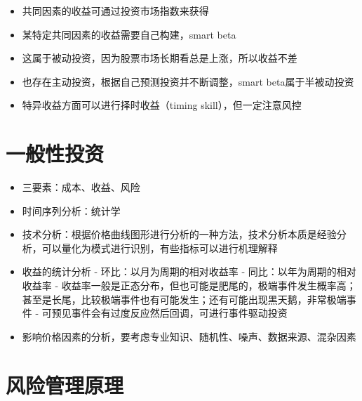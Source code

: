 \documentclass[]{book}
\providecommand{\tightlist}{%
  \setlength{\itemsep}{0pt}\setlength{\parskip}{0pt}}
\begin{document}
\begin{itemize}
\tightlist
\item
  共同因素的收益可通过投资市场指数来获得
\item
  某特定共同因素的收益需要自己构建，smart beta
\item
  这属于被动投资，因为股票市场长期看总是上涨，所以收益不差
\item
  也存在主动投资，根据自己预测投资并不断调整，smart beta属于半被动投资
\item
  特异收益方面可以进行择时收益（timing skill），但一定注意风控
\end{itemize}

\section{一般性投资}

\begin{itemize}
\tightlist
\item
  三要素：成本、收益、风险
\item
  时间序列分析：统计学
\item
  技术分析：根据价格曲线图形进行分析的一种方法，技术分析本质是经验分析，可以量化为模式进行识别，有些指标可以进行机理解释
\item
  收益的统计分析
  - 环比：以月为周期的相对收益率
  - 同比：以年为周期的相对收益率
  - 收益率一般是正态分布，但也可能是肥尾的，极端事件发生概率高；甚至是长尾，比较极端事件也有可能发生；还有可能出现黑天鹅，非常极端事件
  - 可预见事件会有过度反应然后回调，可进行事件驱动投资
\item
  影响价格因素的分析，要考虑专业知识、随机性、噪声、数据来源、混杂因素
\end{itemize}

\section{风险管理原理}
\end{document}
